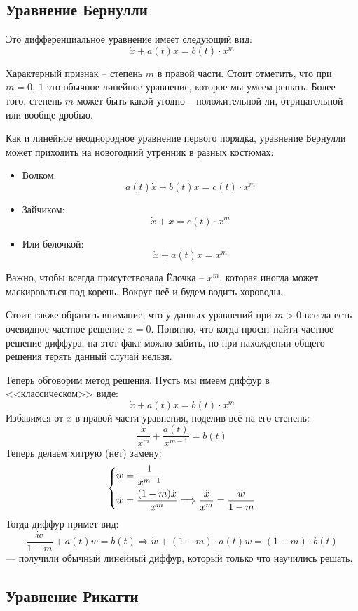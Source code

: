 \documentclass[a4paper,12pt]{article}
\newcommand{\dw}{\dot{w}}
\newcommand{\dx}{\dot{x}}
\begin{document}
\subsection{Уравнение Бернулли}

Это дифференциальное уравнение имеет следующий вид:
\[\dx + a(t)x = b(t)\cdot x^m\]

Характерный признак -- степень $m$ в правой части. Стоит отметить, что при $m = 0,\ 1$ это обычное линейное уравнение, которое мы умеем решать. Более того, степень $m$ может быть какой угодно -- положительной ли, отрицательной или вообще дробью.

Как и линейное неоднородное уравнение первого порядка, уравнение Бернулли может приходить на новогодний утренник в разных костюмах:
\begin{itemize}
	\item Волком:
		\[a(t)\dx +  b(t)x = c(t) \cdot x^m\]
	\item Зайчиком:
		\[\dx + x = c(t) \cdot x^m\]
	\item Или белочкой:
		\[\dx + a(t)x = x^m\]
\end{itemize}
Важно, чтобы всегда присутствовала Ёлочка -- $x^m$, которая иногда может маскироваться под корень. Вокруг неё и будем водить хороводы.

Стоит также обратить внимание, что у данных уравнений при $m > 0$ всегда есть очевидное частное решение $x = 0$. Понятно, что когда просят найти частное решение диффура, на этот факт можно забить, но при нахождении общего решения терять данный случай нельзя.

Теперь обговорим метод решения. Пусть мы имеем диффур в <<классическом>> виде:
\[\dx + a(t)x = b(t)\cdot x^m\]
Избавимся от $x$ в правой части уравнения, поделив всё на его степень:
\[\dfrac{\dx}{x^m} + \dfrac{a(t)}{x^{m - 1}} = b(t)\]
Теперь делаем хитрую (нет) замену:
\[\left\{\begin{gathered}
w = \dfrac{1}{x^{m - 1}}\hfill\\
\dw = \dfrac{(1 - m)\dx}{x^m} \Longrightarrow \dfrac{\dx}{x^m} = \dfrac{\dw}{1 - m}\hfill
\end{gathered}\right.\]
Тогда диффур примет вид:
\[\dfrac{\dw}{1 - m} + a(t)w = b(t) \Longrightarrow \dw + (1 - m)\cdot a(t)w = (1 - m)\cdot b(t)\] --- получили обычный линейный диффур, который только что научились решать.


\subsection{Уравнение Рикатти}
\end{document}
